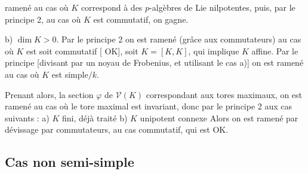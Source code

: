 \documentclass[11pt,a4paper]{article}
\begin{document}

ramené au cas où $K$ correspond à des $p$-algèbres de Lie
nilpotentes, puis, par le principe 2, au cas où $K$ est commutatif, on
gagne.

b) $\dim K > 0$. Par le principe 2 \struck{\ill{}} on est ramené
(grâce aux commutateurs) au cas où $K$ est soit
commutatif [ OK], soit $K = [K,K]$, qui implique $K$
affine. \struck{\ill{}} Par le  principe [divisant
par un noyau de Frobenius, et utilisant le cas a)] on est ramené au cas où
$K$ est simple$/k$.

Prenant alors, la section $\varphi$ de $\mathcal{V}(K)$ correspondant aux
tores maximaux, on \struck{\ill{}} est ramené  au
cas où le tore maximal est \struck{\ill{}} invariant, donc par le principe 2
aux   cas suivants : a) $K$ fini, déjà
traité b) $K$ \struck{\ill{}} unipotent connexe
Alors on est ramené par dévissage par commutateurs,
au cas commutatif, qui est OK.

\subsection*{Cas non semi-simple}


\end{document}
